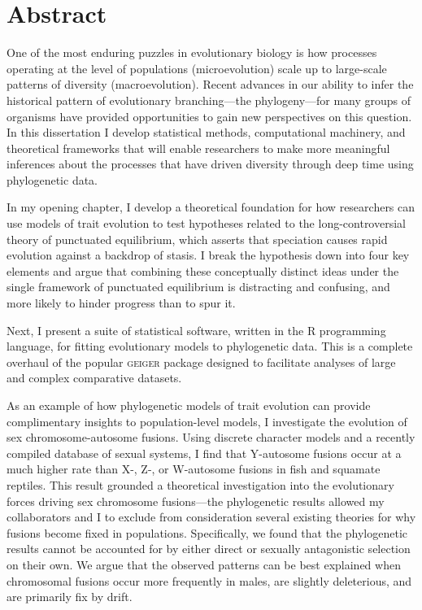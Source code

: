\chapter*{Abstract}

One of the most enduring puzzles in evolutionary biology is how processes operating at the level of populations (microevolution) scale up to large-scale patterns of diversity (macroevolution). Recent advances in our ability to infer the historical pattern of evolutionary branching---the phylogeny---for many groups of organisms have provided opportunities to gain new perspectives on this question. In this dissertation I develop statistical methods, computational machinery, and theoretical frameworks that will enable researchers to make more meaningful inferences about the processes that have driven diversity through deep time using phylogenetic data.

In my opening chapter, I develop a theoretical foundation for how researchers can use models of trait evolution to test hypotheses related to the long-controversial theory of punctuated equilibrium, which asserts that speciation causes rapid evolution against a backdrop of stasis. I break the hypothesis down into four key elements and argue that combining these conceptually distinct ideas under the single framework of punctuated equilibrium is distracting and confusing, and more likely to hinder progress than to spur it. 

Next, I present a suite of statistical software, written in the R programming language, for fitting evolutionary models to phylogenetic data. This is a complete overhaul of the popular \textsc{geiger} package designed to facilitate analyses of large and complex comparative datasets.

As an example of how phylogenetic models of trait evolution can provide complimentary insights to population-level models, I investigate the evolution of sex chromosome-autosome fusions. Using discrete character models and a recently compiled database of sexual systems, I find that Y-autosome fusions occur at a much higher rate than X-, Z-, or W-autosome fusions in fish and squamate reptiles. This result grounded a theoretical investigation into the evolutionary forces driving sex chromosome fusions---the phylogenetic results allowed my collaborators and I to exclude from consideration several existing theories for why fusions become fixed in populations. Specifically, we found that the phylogenetic results cannot be accounted for by either direct or sexually antagonistic selection on their own. We argue that the observed patterns can be best explained when chromosomal fusions occur more frequently in males, are slightly deleterious, and are primarily fix by drift.

